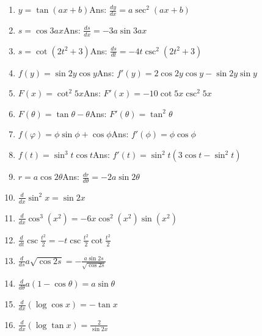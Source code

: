 \begin{enumerate}
\item
$y = \tan(ax + b)$\qquad\qquad\qquad\qquad\qquad\qquad Ans:  	$\frac{dy}{dx} 	= a\sec^2(ax + b)$

\item
$s = \cos 3ax$\qquad\qquad\qquad\qquad\qquad\qquad Ans:  	$\frac{ds}{dx} 	= - 3a\sin 3ax$

\item
$ s = \cot(2t^2 + 3)$\qquad\qquad\qquad\qquad\qquad\qquad Ans:  	$\frac{ds}{dt} 	= - 4t\csc^2(2t^2 + 3)$

\item
$f(y) = \sin 2y\cos y$\qquad\qquad\qquad\qquad Ans:  	$f'(y) 	= 2\cos 2y\cos y - \sin 2y\sin y$

\item
$F(x) = \cot^2 5x$\qquad\qquad\qquad\qquad\qquad\qquad Ans:  	$F'(x) 	= - 10\cot 5x\csc^2 5x$

\item
$F(\theta ) = \tan \theta - \theta$\qquad\qquad\qquad\qquad\qquad\qquad Ans:  	$F'(\theta) 	= \tan^2 \theta$

\item
$f(φ) = \phi \sin\phi  + \cos\phi $\qquad\qquad\qquad\qquad\qquad\qquad Ans:  	$f'(\phi )	= \phi \cos \phi $

\item
$f(t) = \sin^3 t\cos t$\qquad\qquad\qquad\qquad Ans:  	$f'(t) 	= \sin^2 t(3\cos t - \sin^2 t)$

\item
$r = a\cos 2\theta$\qquad\qquad\qquad\qquad\qquad\qquad Ans:  	$\frac{dr}{d\theta} 	= - 2a\sin 2\theta$

\item
$\frac{d}{dx} \sin^2 x = \sin 2x$

\item
$\frac{d}{dx} \cos^3 (x^2) = -6x \cos^2 (x^2) \sin (x^2)$

\item
$\frac{d}{dt} \csc \frac{t^2}{2} = -t \csc \frac{t^2}{2} \cot \frac{t^2}{2}$

\item
$\frac{d}{ds} a \sqrt{\cos 2s} = -\frac{a \sin 2s}{\sqrt{\cos 2s}}$

\item
$\frac{d}{d\theta} a(1 - \cos \theta) = a \sin \theta$

\item
$\frac{d}{dx}(\log \cos x) = -\tan x$

\item
$\frac{d}{dx}(\log \tan x) = \frac{2}{\sin 2x}$


\end{enumerate}
